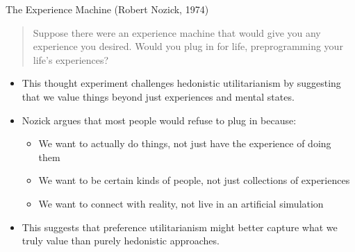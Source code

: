 \documentclass[aspectratio=169]{beamer}
\begin{document}
\begin{frame}{The Experience Machine (Robert Nozick, 1974)}
    \begin{quote}
        Suppose there were an experience machine that would give you any experience you desired. Would you plug in for life, preprogramming your life's experiences?
    \end{quote}
    \begin{itemize}
        \item This thought experiment challenges hedonistic utilitarianism by suggesting that we value things beyond just experiences and mental states.
        
        \item Nozick argues that most people would refuse to plug in because:
            \begin{itemize}
                \item We want to actually do things, not just have the experience of doing them
                \item We want to be certain kinds of people, not just collections of experiences
                \item We want to connect with reality, not live in an artificial simulation
            \end{itemize}
        
        \item This suggests that preference utilitarianism might better capture what we truly value than purely hedonistic approaches.
    \end{itemize}
\end{frame}
\end{document}
